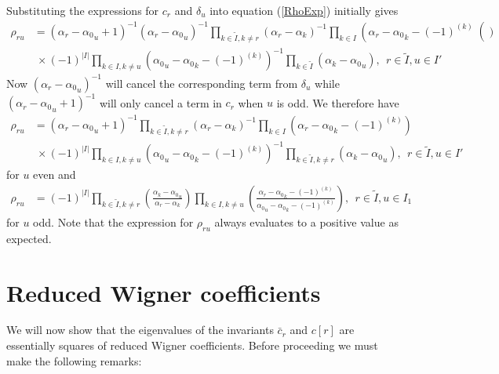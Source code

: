 \documentclass[12pt]{article}
\begin{document}
Substituting the expressions for ${c}_r$ and ${\delta}_u$ into equation 
 (\ref{RhoExp}) initially gives
\begin{align*}
{\rho}_{ru} &= ({\alpha}_r-{\alpha_0}_u + 1)^{-1}({\alpha}_r-{\alpha_0}_u)^{-1} \prod_{k\in \tilde{I},k\neq r} \left(\alpha_r - \alpha_k \right)^{-1}\prod_{k\in
I} \left(\alpha_r - {\alpha_0}_k - (-1)^{(k)}\right() \\
& ~\times (-1)^{|I|} \prod_{k\in I,k\neq u} \left({\alpha_0}_u - {\alpha_0}_k -
(-1)^{(k)}\right)^{-1}\prod_{k\in\tilde{I}} \left(\alpha_k - {\alpha_0}_u \right),\ \ r\in \tilde{I},u\in I' 
\end{align*}
Now $({\alpha}_r-{\alpha_0}_u)^{-1}$ will cancel the corresponding term from $\delta_u$ while $
({\alpha}_r-{\alpha_0}_u + 1)^{-1}$ will only cancel a term in $c_r$ when $u$ is odd. We therefore have
\begin{align*}
{\rho}_{ru} &= ({\alpha}_r-{\alpha_0}_u + 1)^{-1}\prod_{k\in \tilde{I},k\neq r} \left(\alpha_r - \alpha_k \right)^{-1}\prod_{k\in
I} \left(\alpha_r - {\alpha_0}_k - (-1)^{(k)}\right) \\
& ~\times (-1)^{|I|} \prod_{k\in I,k\neq u} \left({\alpha_0}_u - {\alpha_0}_k -
(-1)^{(k)}\right)^{-1}\prod_{k\in\tilde{I},k \neq r} \left(\alpha_k - {\alpha_0}_u \right),\ \ r\in \tilde{I},u\in I' 
\end{align*}
for $u$ even and
\begin{align*}
{\rho}_{ru} &= (-1)^{|I|} \prod_{k\in \tilde{I},k\neq r} 
\left(
\frac 
{\alpha_k - {\alpha_0}_u  }
{\alpha_r - \alpha_k }
\right)
\prod_{k\in I,k \neq u} 
\left(
\frac
{ \alpha_r - {\alpha_0}_k - (-1)^{(k)} }
{{\alpha_0}_u - {\alpha_0}_k - (-1)^{(k)} }
\right)
,\ \ r\in \tilde{I},u\in I_1
\end{align*}
for $u$ odd.
Note that the expression for $\rho_{ru}$ always evaluates to a positive value as expected.

\section{Reduced Wigner coefficients} 
\label{Wigner}

We will now show that the eigenvalues of the invariants $\bar{c}_r$ and $c[r]$ are 
essentially squares of reduced Wigner coefficients. Before proceeding we must make the following remarks:
\end{document}
